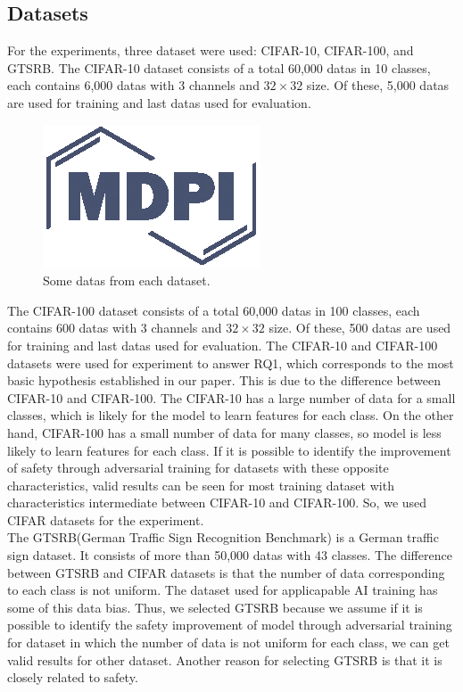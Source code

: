 \documentclass[journal,article,submit,moreauthors,pdftex]{Definitions/mdpi}
\begin{document}
\subsection{Datasets}

For the experiments, three dataset were used: CIFAR-10, CIFAR-100, and GTSRB. The CIFAR-10 dataset consists of a total 60,000 datas in 10 classes, each contains 6,000 datas with 3 channels and \begin{math}{32\times 32}\end{math} size.
Of these, 5,000 datas are used for training and last datas used for evaluation.

\begin{figure}[H] 
\includegraphics[width=5 cm]{Definitions/logo-mdpi}
\caption{Some datas from each dataset.\label{fig3}}
\end{figure} 

The CIFAR-100 dataset consists of a total 60,000 datas in 100 classes, each contains 600 datas with 3 channels and \begin{math}{32\times 32}\end{math} size. Of these, 500 datas are used for training and last datas used for evaluation.
The CIFAR-10 and CIFAR-100 datasets were used for experiment to answer RQ1, which corresponds to the most basic hypothesis established in our paper.
This is due to the difference between CIFAR-10 and CIFAR-100. The CIFAR-10 has a large number of data for a small classes, which is likely for the model to learn features for each class. On the other hand, CIFAR-100 has a small number of data for many classes, so model is less likely to learn features for each class.
If it is possible to identify the improvement of safety through adversarial training for datasets with these opposite characteristics, valid results can be seen for most training dataset with characteristics intermediate between CIFAR-10 and CIFAR-100. So, we used CIFAR datasets for the experiment. \\

The GTSRB(German Traffic Sign Recognition Benchmark) is a German traffic sign dataset. It consists of more than 50,000 datas with 43 classes.
The difference between GTSRB and CIFAR datasets is that the number of data corresponding to each class is not uniform.
The dataset used for applicapable AI training has some of this data bias.
Thus, we selected GTSRB because we assume if it is possible to identify the safety improvement of model through adversarial training for dataset in which the number of data is not uniform for each class, we can get valid results for other dataset.
Another reason for selecting GTSRB is that it is closely related to safety.
\end{document}
